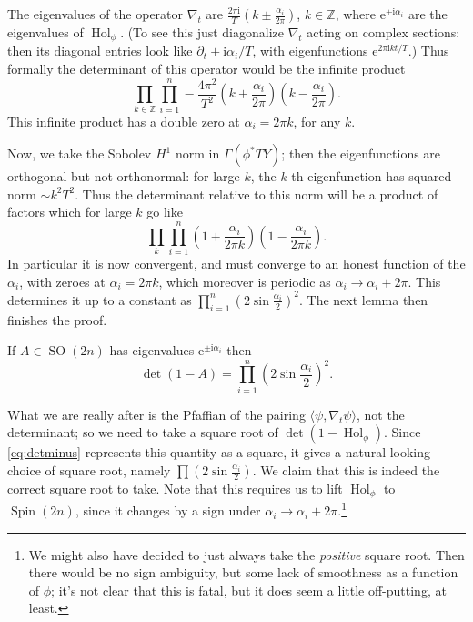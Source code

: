 \documentclass[12pt,letterpaper,reqno]{article}
\numberwithin{equation}{section}
\newcommand{\Z}{\ensuremath{\mathbb Z}}
\newcommand{\I}{{\mathrm i}}
\newcommand{\e}{{\mathrm e}}
\newcommand{\IP}[1]{\langle#1\rangle}
\newcommand{\ti}[1]{\textit{#1}}
\DeclareMathOperator{\Hol}{Hol}
\DeclareMathOperator{\Spin}{Spin}
\DeclareMathOperator{\SO}{SO}
\newcommand{\fixme}[1]{{\color{orange}{[#1]}}}
\begin{document}
\begin{pf} The eigenvalues of the operator $\nabla_t$ are
$\frac{2 \pi \I}{T}(k \pm \frac{\alpha_i}{2\pi})$, $k \in \Z$, where $\e^{\pm \I \alpha_i}$ are the eigenvalues
of $\Hol_\phi$. 
(To see this just diagonalize $\nabla_t$ acting on complex sections:
then its diagonal entries look like $\partial_t \pm \I \alpha_i / T$, with eigenfunctions
$\e^{2 \pi \I k t / T}$.)
Thus formally the determinant of this operator would be the infinite product
\begin{equation}
  \prod_{k \in \Z} \prod_{i=1}^n - \frac{4 \pi^2}{T^2} \left( k + \frac{\alpha_i}{2\pi} \right)\left( k - \frac{\alpha_i}{2\pi} \right).
\end{equation}
This infinite product has a double zero at $\alpha_i = 2 \pi k$, for any $k$.

Now, we take the 
Sobolev $H^1$ norm in $\Gamma(\phi^* TY)$; then the eigenfunctions are orthogonal
but not orthonormal: for large $k$,
the $k$-th eigenfunction has squared-norm $\sim k^2 T^2$. 
Thus the determinant relative to this norm will be a product of factors which
for large $k$ go like
\begin{equation}
  \prod_{k} \prod_{i=1}^n \left( 1 + \frac{\alpha_i}{2\pi k} \right)\left( 1 - \frac{\alpha_i}{2\pi k} \right).
\end{equation}
In particular it is now convergent, and must converge to an honest function of 
the $\alpha_i$, with zeroes at $\alpha_i = 2 \pi k$, which moreover is periodic 
as $\alpha_i \to \alpha_i + 2 \pi$. This \fixme{plus some condition on asymptotic
growth} determines it
up to a constant as
$\prod_{i=1}^n (2 \sin \frac{\alpha_i}{2})^2$. The next lemma then finishes the proof.
\end{pf}

\begin{lem}
If $A \in \SO(2n)$ has eigenvalues $\e^{\pm \I \alpha_i}$ then
\begin{equation} \label{eq:detminus}
  \det(1 - A) = \prod_{i=1}^n \left( 2 \sin \frac{\alpha_i}{2} \right)^2.
\end{equation}
\end{lem}

\fixme{comment on zeta reg?}

What we are really after is the Pfaffian of the pairing $\IP{\psi, \nabla_t \psi}$, 
not the determinant; so we need to take a square root of $\det(1 - \Hol_\phi)$.
Since \eqref{eq:detminus} represents this quantity as a square, it 
gives a natural-looking choice of square root, namely
$\prod (2 \sin \frac{\alpha_i}{2})$. We claim that this is
indeed the correct square root to take. Note that this
requires us to lift $\Hol_\phi$ to $\Spin(2n)$, since it 
changes by a sign under $\alpha_i \to \alpha_i + 2 \pi$.\footnote{We might
also have decided to just always take the \ti{positive} square root.
Then there would be no sign ambiguity, but some lack of smoothness as a
function of $\phi$; it's not clear that this is fatal, but it does seem
a little off-putting, at least.}
\end{document}
